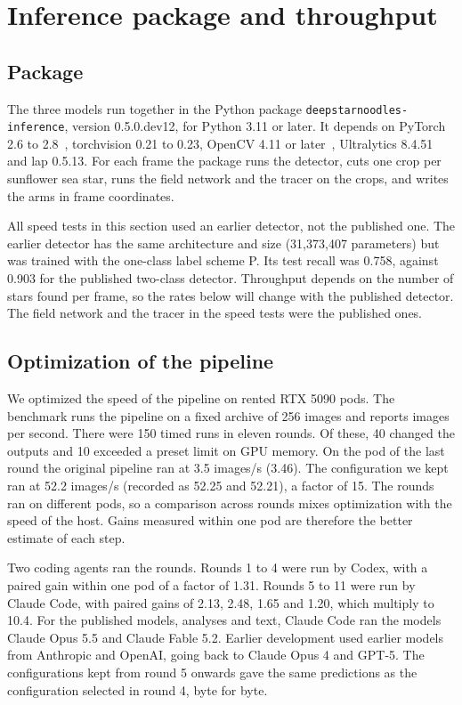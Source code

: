 
\section*{Inference package and throughput}

\subsection*{Package}

The three models run together in the Python package \texttt{deepstarnoodles-inference}, version 0.5.0.dev12, for Python 3.11 or later.
It depends on PyTorch 2.6 to 2.8~\cite{paszke2019pytorch}, torchvision 0.21 to 0.23, OpenCV 4.11 or later~\cite{bradski2000opencv}, Ultralytics 8.4.51 and lap 0.5.13.
For each frame the package runs the detector, cuts one crop per sunflower sea star, runs the field network and the tracer on the crops, and writes the arms in frame coordinates.

All speed tests in this section used an earlier detector, not the published one.
The earlier detector has the same architecture and size (31,373,407 parameters) but was trained with the one-class label scheme P.
Its test recall was 0.758, against 0.903 for the published two-class detector.
Throughput depends on the number of stars found per frame, so the rates below will change with the published detector.
The field network and the tracer in the speed tests were the published ones.

\subsection*{Optimization of the pipeline}

We optimized the speed of the pipeline on rented RTX 5090 pods.
The benchmark runs the pipeline on a fixed archive of 256 images and reports images per second.
There were 150 timed runs in eleven rounds.
Of these, 40 changed the outputs and 10 exceeded a preset limit on GPU memory.
On the pod of the last round the original pipeline ran at 3.5 images/s (3.46).
The configuration we kept ran at 52.2 images/s (recorded as 52.25 and 52.21), a factor of 15.
The rounds ran on different pods, so a comparison across rounds mixes optimization with the speed of the host.
Gains measured within one pod are therefore the better estimate of each step.

Two coding agents ran the rounds.
Rounds 1 to 4 were run by Codex, with a paired gain within one pod of a factor of 1.31.
Rounds 5 to 11 were run by Claude Code, with paired gains of 2.13, 2.48, 1.65 and 1.20, which multiply to 10.4.
For the published models, analyses and text, Claude Code ran the models Claude Opus 5.5 and Claude Fable 5.2.
Earlier development used earlier models from Anthropic and OpenAI, going back to Claude Opus 4 and GPT-5.
The configurations kept from round 5 onwards gave the same predictions as the configuration selected in round 4, byte for byte.

